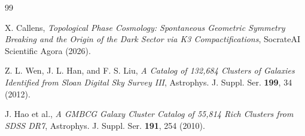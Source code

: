 \documentclass[aps,prd,twocolumn,nofootinbib,superscriptaddress,10pt]{revtex4-2}
\begin{document}
\begin{thebibliography}{99}

X. Callens,
\textit{Topological Phase Cosmology: Spontaneous Geometric Symmetry Breaking and the Origin of the Dark Sector via K3 Compactifications},
SocrateAI Scientific Agora (2026).

Z. L. Wen, J. L. Han, and F. S. Liu,
\textit{A Catalog of 132,684 Clusters of Galaxies Identified from Sloan Digital Sky Survey III},
Astrophys. J. Suppl. Ser. \textbf{199}, 34 (2012).

J. Hao et al.,
\textit{A GMBCG Galaxy Cluster Catalog of 55,814 Rich Clusters from SDSS DR7},
Astrophys. J. Suppl. Ser. \textbf{191}, 254 (2010).

\end{thebibliography}
\end{document}
